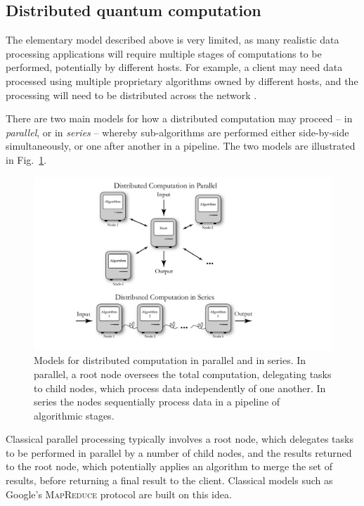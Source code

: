 \documentclass[aps,rmp,twocolumn,amsmath,amssymb,nofootinbib,superscriptaddress,longbibliography,floatfix,table-of-contents,eqsecnum]{revtex4-1}
\begin{document}
%
%

\subsection{Distributed quantum computation} \label{sec:dist_QC} 

The elementary model described above is very limited, as many realistic data processing applications will require multiple stages of computations to be performed, potentially by different hosts. For example, a client may need data processed using multiple proprietary algorithms owned by different hosts, and the processing will need to be distributed across the network \cite{bib:Cirac99}.

There are two main models for how a distributed computation may proceed -- in \textit{parallel}, or in \textit{series} -- whereby sub-algorithms are performed either side-by-side simultaneously, or one after another in a pipeline. The two models are illustrated in Fig.~\ref{fig:distributed}.

\begin{figure}[!htb]
\includegraphics[width=\columnwidth]{distributed}
\caption{Models for distributed computation in parallel and in series. In parallel, a root node oversees the total computation, delegating tasks to child nodes, which process data independently of one another. In series the nodes sequentially process data in a pipeline of algorithmic stages.} \label{fig:distributed}
\end{figure}

Classical parallel processing typically involves a root node, which delegates tasks to be performed in parallel by a number of child nodes, and the results returned to the root node, which potentially applies an algorithm to merge the set of results, before returning a final result to the client. Classical models such as Google's \textsc{MapReduce} protocol \cite{bib:MapReduce} are built on this idea.
\end{document}
